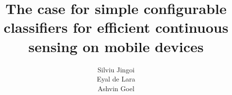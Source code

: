 \documentclass[letterpaper,twocolumn]{acm_proc_article-sp}
\begin{document}
\date{}


\title{The case for simple configurable classifiers for efficient continuous sensing on mobile devices}


\author{
\alignauthor Silviu Jingoi\\
\alignauthor Eyal de Lara\\
\alignauthor Ashvin Goel\\
}

\maketitle











\end{document}
